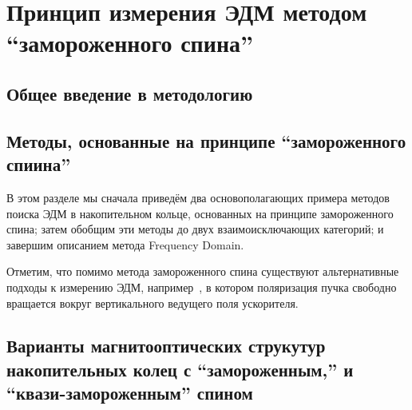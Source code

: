 \chapter{Принцип измерения ЭДМ методом ``замороженного спина'' }\label{chpt1:top-level}

\section{Общее введение в методологию}\label{chpt1:FS-introduction}


\section{Методы, основанные на   принципе ``замороженного спиина''}\label{chpt1:FS-methods}
В этом разделе мы сначала приведём два основополагающих примера методов поиска ЭДМ
в накопительном кольце, основанных на принципе замороженного спина;
затем обобщим  эти методы до двух взаимоисключающих категорий;
и завершим описанием метода Frequency Domain.

Отметим, что помимо метода замороженного спина существуют альтернативные подходы к измерению ЭДМ, например~\cite{COSY:SpinTuneMapping, COSY:Partially-Frozen-Spin}, в котором поляризация пучка свободно вращается вокруг вертикального ведущего поля ускорителя.



\section{Варианты магнитооптических струкутур накопительных колец с ``замороженным,'' и ``квази-замороженным'' спином} \label{chpt1:Lattices}



\clearpage